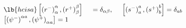 \begin{equation}
\begin{array}{l}
\lb{heisa}
\left[ \left( r^{-}\right) _{\alpha }^{{\alpha }},
\left(r^{+}\right) _{\beta }^{{\beta }}\right]  
\ \ \;\;= \delta _{\alpha \beta},  \ \ \ \ 
\left[ \left( s^{-}\right) _{a}^{{a}},
\left( s^{+}\right) _{b}^{{b}}\right]  
= \delta _{ab} \\
\left[ \left( \psi ^{-}\right) ^{{\alpha }
{a}},\left( \psi^{+}\right) _{\alpha a}\right]  
= 1  
\end{array}
\end{equation}

